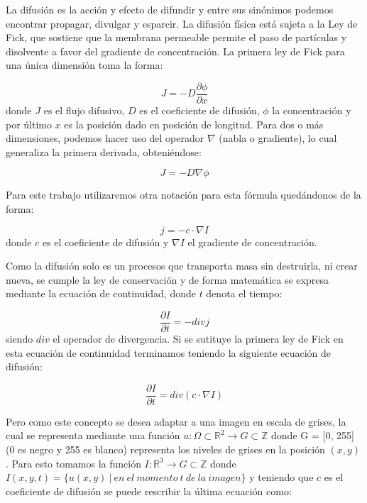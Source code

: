 \documentclass[a4paper,10pt,twocolumn]{article}
\begin{document}
La difusi\'on es la acci\'on y efecto de difundir y entre sus sin\'onimos podemos encontrar propagar, divulgar y esparcir. La difusi\'on f\'isica est\'a sujeta a la Ley de Fick, que sostiene que la membrana permeable permite el paso de part\'iculas y disolvente a favor del gradiente de concentraci\'on. La primera ley de Fick para una \'unica dimensi\'on toma la forma:

\begin{equation}
	J = -D \frac{\partial \phi}{\partial x}
\end{equation}
donde $J$ es el flujo difusivo, $D$ es el coeficiente de difusi\'on, $\phi$ la concentraci\'on y por \'ultimo $x$ es la posici\'on dado en posici\'on de longitud. Para dos o m\'as dimensiones, podemos hacer uso del operador $\nabla$ (nabla o gradiente), lo cual generaliza la primera derivada, obteni\'endose:

\begin{equation}
	J = -D \nabla \phi
\end{equation}

Para este trabajo utilizaremos otra notaci\'on para esta f\'ormula qued\'andonos de la forma:

\begin{equation}
	j = -c \cdot \nabla I
\end{equation}
donde $c$ es el coeficiente de difusi\'on y $\nabla I$ el gradiente de concentraci\'on.

Como la difusi\'on solo es un procesos que transporta masa sin destruirla, ni crear nueva, se cumple la ley de conservaci\'on y de forma matem\'atica se expresa mediante la ecuaci\'on de continuidad, donde $t$ denota el tiempo:

\begin{equation}
	\frac{\partial I}{\partial t} = - div j
\end{equation}
siendo $div$ el operador de divergencia. Si se sutituye la primera ley de Fick en esta ecuaci\'on de continuidad terminamos teniendo la siguiente ecuaci\'on de difusi\'on:

\begin{equation}
	\frac{\partial I}{\partial t} = div(c \cdot \nabla I)
\end{equation}

Pero como este concepto se desea adaptar a una imagen en escala de grises, la cual se representa mediante una funci\'on $u:\Omega \subset \mathbb{R}^2 \rightarrow G \subset \mathbb{Z}$ donde G = [0, 255] (0 es negro y 255 es blanco) representa los niveles de grises en la posici\'on $(x,y)$. Para esto tomamos la funci\'on $I: \mathbb{R}^3 \rightarrow G \subset \mathbb{Z}$ donde $I(x,y,t) = \{u(x,y)\ |\ en\ el\ momento\ t\ de\ la\ imagen\}$ y teniendo que $c$ es el coeficiente de difusi\'on se puede rescribir la \'ultima ecuaci\'on como:
\end{document}

